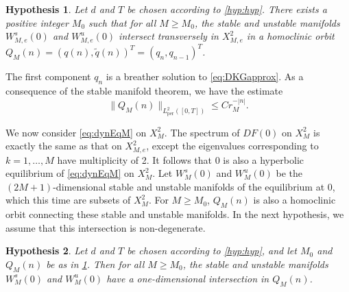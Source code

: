 \documentclass[12pt,reqno]{amsart}
\def\per{\textrm{per}}
\newtheorem{hypothesis}{Hypothesis}
\theoremstyle{definition}
\begin{document}
\begin{hypothesis}\label{hyp:breather}
Let $d$ and $T$ be chosen according to \cref{hyp:hyp}. There exists a positive integer $M_0$ such that for all $M \geq M_0$, the stable and unstable manifolds $W_{M,e}^s(0)$ and $W_{M,e}^u(0)$ intersect transversely in $X_{M,e}^2$ in a homoclinic orbit $Q_M(n) = (q(n), \tilde{q}(n))^T = (q_n, q_{n-1})^T$. 
\end{hypothesis}
The first component $q_n$ is a breather solution to \cref{eq:DKGapprox}. As a consequence of the stable manifold theorem, we have the estimate 
\begin{equation}\label{eq:U1decayest}
\|Q_M(n)\|_{L^2_\per([0,T])} \leq C r_M^{-|n|}.
\end{equation}

We now consider \cref{eq:dynEqM} on $X_M^2$. The spectrum of $DF(0)$ on $X_M^2$ is exactly the same as that on $X_{M,e}^2$, except the eigenvalues corresponding to $k = 1, \dots, M$ have multiplicity of 2. It follows that 0 is also a hyperbolic equilibrium of \cref{eq:dynEqM} on $X_M^2$. Let $W_M^s(0)$ and $W_M^u(0)$ be the $(2M+1)$-dimensional stable and unstable manifolds of the equilibrium at 0, which this time are subsets of $X_M^2$. For $M \geq M_0$, $Q_M(n)$ is also a homoclinic orbit connecting these stable and unstable manifolds. In the next hypothesis, we assume that this intersection is non-degenerate.

\begin{hypothesis}\label{hyp:breathernondegen}
Let $d$ and $T$ be chosen according to \cref{hyp:hyp}, and let $M_0$ and $Q_M(n)$ be as in \cref{hyp:breather}. Then for all $M \geq M_0$, the stable and unstable manifolds $W_M^s(0)$ and $W_M^u(0)$ have a one-dimensional intersection in $Q_M(n)$.
\end{hypothesis}
\end{document}

